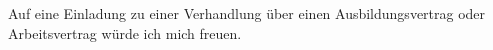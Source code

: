 		Auf eine Einladung zu einer Verhandlung über einen Ausbildungsvertrag oder Arbeitsvertrag würde ich mich freuen.